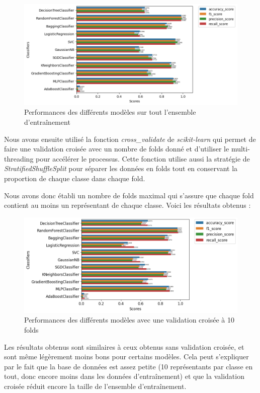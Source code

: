 \documentclass{article}
\begin{document}
\begin{figure}[h]
    \centering
    \includegraphics[width=1.2\textwidth]{img/all_perfs_without_cv.png}
    \caption{Performances des différents modèles sur tout l'ensemble d'entraînement}
\end{figure}


Nous avons ensuite utilisé la fonction \textit{cross\_validate} \cite{CV} de \textit{scikit-learn}
qui permet de faire une validation croisée avec un nombre de folds donné et d'utiliser 
le multi-threading pour accélérer le processus. Cette fonction utilise aussi la 
stratégie de \textit{StratifiedShuffleSplit} \cite{SSS} pour séparer les données en
folds tout en conservant la proportion de chaque classe dans chaque fold.

Nous avons donc établi un nombre de folds maximal qui s'assure que chaque fold 
contient au moins un représentant de chaque classe.
\newpage
Voici les résultats obtenus :

\begin{figure}[h]
    \centering
    \includegraphics[width=1.2\textwidth]{img/all_perfs_with_cv.png}
    \caption{Performances des différents modèles avec une validation croisée à 10 folds}
\end{figure}


Les résultats obtenus sont similaires à ceux obtenus sans validation croisée, et sont
même légèrement moins bons pour certains modèles. Cela peut s'expliquer par le fait
que la base de données est assez petite (10 représentants par classe en tout, donc
encore moins dans les données d'entraînement) et que la validation croisée réduit encore
la taille de l'ensemble d'entraînement. 
\end{document}
